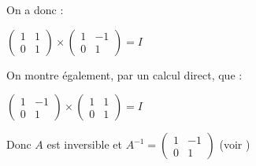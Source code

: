 \begin{corrige}
\begin{enumerate}
          On a donc :
          \par
          $\begin{pmatrix} 1 & 1 \\ 0 & 1\end{pmatrix}\times \begin{pmatrix}1 & -1 \\ 0 &  1\end{pmatrix}=I$
          \par
          On montre également, par un calcul direct, que :
          \par
          $\begin{pmatrix} 1 & -1 \\ 0  &  1\end{pmatrix}\times \begin{pmatrix}1 & 1 \\ 0 & 1\end{pmatrix}=I$
          \par
          Donc $A$ est inversible et $A^{-1}=\begin{pmatrix} 1 & -1 \\ 0 & 1 \end{pmatrix}$ (voir )
     \end{enumerate}
\end{corrige}
